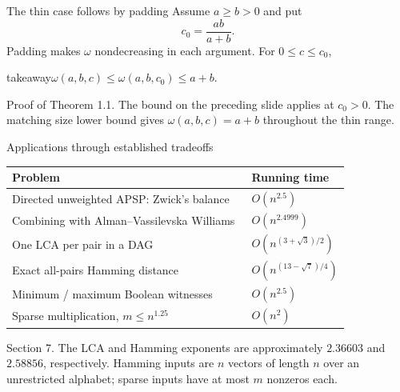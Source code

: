 \documentclass[aspectratio=169,11pt]{beamer}
\newcommand{\source}[1]{\vfill\par{\fontsize{7.5}{9}\selectfont\color{muted}#1\par}}
\newcommand{\takeaway}[1]{\begin{beamercolorbox}[sep=0.65em,wd=\linewidth]{takeaway}#1\end{beamercolorbox}}
\begin{document}
\begin{frame}{The thin case follows by padding}
  Assume $a\ge b>0$ and put
  \[
    c_0=\frac{ab}{a+b}.
  \]
  Padding makes $\omega$ nondecreasing in each argument.
  For $0\le c\le c_0$,
  \takeaway{$\displaystyle
    \omega(a,b,c)
    \le\omega(a,b,c_0)
    \le a+b.
  $}
  \source{Proof of Theorem 1.1. The bound on the preceding slide applies
  at $c_0>0$. The matching size lower bound gives
  $\omega(a,b,c)=a+b$ throughout the thin range.}
\end{frame}

\begin{frame}{Applications through established tradeoffs}
  \begin{center}
  \renewcommand{\arraystretch}{1.25}
  \begin{tabular}{@{}p{7.8cm}l@{}}
  \toprule
  Problem & Running time\\
  \midrule
  Directed unweighted APSP: Zwick's balance~\cite{zwick} & $O(n^{2.5})$\\
  Combining with Alman--Vassilevska Williams~\cite{aw} & $O(n^{2.4999})$\\
  One LCA per pair in a DAG~\cite{lca} & $O(n^{(3+\sqrt3)/2})$\\
  Exact all-pairs Hamming distance~\cite{hamming,dominance} & $O(n^{(13-\sqrt7)/4})$\\
  Minimum / maximum Boolean witnesses~\cite{witnesses} & $O(n^{2.5})$\\
  Sparse multiplication, $m\le n^{1.25}$~\cite{sparse} & $O(n^2)$\\
  \bottomrule
  \end{tabular}
  \end{center}
  \source{Section 7. The LCA and Hamming exponents are approximately
  $2.36603$ and $2.58856$, respectively.
  Hamming inputs are $n$ vectors of length $n$ over an unrestricted alphabet;
  sparse inputs have at most $m$ nonzeros each.}
\end{frame}
\end{document}
